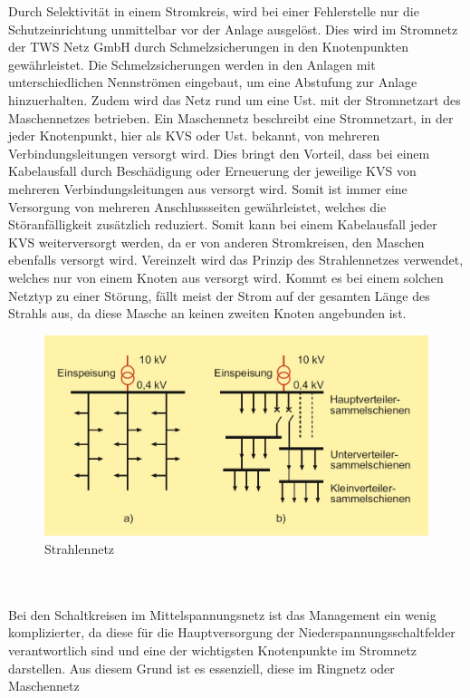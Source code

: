 Durch Selektivität in einem Stromkreis, wird bei einer Fehlerstelle nur die Schutzeinrichtung unmittelbar vor der Anlage ausgelöst. Dies wird im Stromnetz 
der TWS Netz GmbH durch Schmelzsicherungen in den Knotenpunkten gewährleistet. Die Schmelzsicherungen werden in den Anlagen mit unterschiedlichen 
Nennströmen eingebaut, um eine Abstufung zur Anlage hinzuerhalten.  Zudem wird das Netz rund um eine Ust. mit der Stromnetzart des Maschennetzes betrieben. 
Ein Maschennetz beschreibt eine Stromnetzart, in der jeder Knotenpunkt, hier als KVS oder Ust. bekannt, von mehreren Verbindungsleitungen versorgt wird.
Dies bringt den Vorteil, dass bei einem Kabelausfall durch Beschädigung oder Erneuerung der jeweilige KVS von mehreren Verbindungsleitungen aus versorgt wird.
Somit ist immer eine Versorgung von mehreren Anschlussseiten gewährleistet, welches die Störanfälligkeit zusätzlich reduziert. 
Somit kann bei einem Kabelausfall jeder KVS weiterversorgt werden, da er von anderen 
Stromkreisen, den Maschen ebenfalls versorgt wird. Vereinzelt wird das Prinzip des Strahlennetzes verwendet, welches nur von einem Knoten aus versorgt 
wird. Kommt es bei einem solchen Netztyp zu einer Störung, fällt meist der Strom auf der gesamten Länge des Strahls aus, da diese Masche an keinen zweiten 
Knoten angebunden ist. \autocite{Schwab.2012}
\begin{figure}[hbt]
    \centering
    \includegraphics[width=0.98\linewidth]{images/Strahlennetz}
    \caption[Strahlennetz]{Strahlennetz \autocite{Schwab.2012}}
    \label{fig:Strahlennetz}
\end{figure}
\\\\
Bei den Schaltkreisen im Mittelspannungsnetz ist das Management ein wenig komplizierter, da diese für die Hauptversorgung der Niederspannungsschaltfelder 
verantwortlich sind und eine der wichtigsten Knotenpunkte im Stromnetz darstellen. Aus diesem Grund ist es essenziell, diese im Ringnetz oder Maschennetz 

